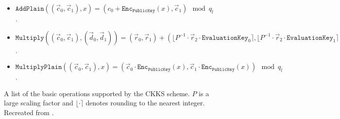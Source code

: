 \begin{figure}[ht]
\begin{tcolorbox}
\begin{itemize}[leftmargin=0.1cm]
            \item $\texttt{AddPlain}((\vec{c}_0, \vec{c}_1), x) = (c_0 + \texttt{Enc}_\texttt{PublicKey}(x), \vec{c}_1) \mod q_l$.
            \item $\texttt{Multiply}((\vec{c}_0, \vec{c}_1), (\vec{d}_0, \vec{d}_1)) = (\vec{r}_0, \vec{r}_1) + (\lfloor P^{-1} \cdot \vec{r}_2 \cdot \texttt{EvaluationKey}_0 \rceil, \lfloor P^{-1} \cdot \vec{r}_2 \cdot \texttt{EvaluationKey}_1  \rceil) \mod q_l$.
            \item $\texttt{MultiplyPlain}((\vec{c}_0, \vec{c}_1), x) = (\vec{c}_0 \cdot \texttt{Enc}_\texttt{PublicKey}(x), \vec{c}_1 \cdot \texttt{Enc}_\texttt{PublicKey}(x)) \mod q_l$.
        \end{itemize}
    \end{tcolorbox}
    \caption[CKKS Operations]{A list of the basic operations supported by the CKKS scheme. $P$ is a large scaling factor and $\lfloor \cdot \rceil$ denotes rounding to the nearest integer. Recreated from \cite{CKKS}.}
    \label{fig:ckksOps}
\end{figure}

\setlength{\leftskip}{0cm}
